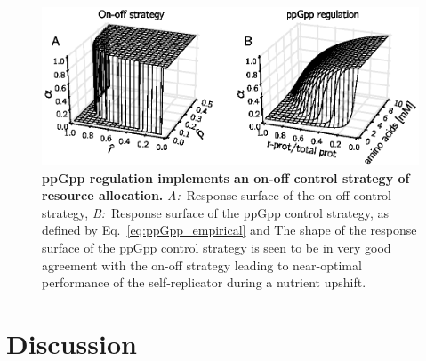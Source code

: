\begin{figure}
\centering
\includegraphics[scale=1]{./Fig/Fig8.eps}
\caption[ppGpp regulation implements a on-off control strategy of resource allocation.]
{
{\bf ppGpp regulation implements an on-off control strategy of resource allocation.}\newline
\textit{A:}~Response surface of the on-off control strategy, 
\textit{B:}~Response surface of the ppGpp control strategy, as defined by Eq.~\ref{eq:ppGpp_empirical} and 
The shape of the response surface of the ppGpp control strategy is seen to be in very good agreement with the on-off strategy leading to near-optimal performance of the self-replicator during a nutrient upshift.
}
\label{fig:ppGppsurface}
\end{figure}

\section*{Discussion}
\label{sec:discussion}

